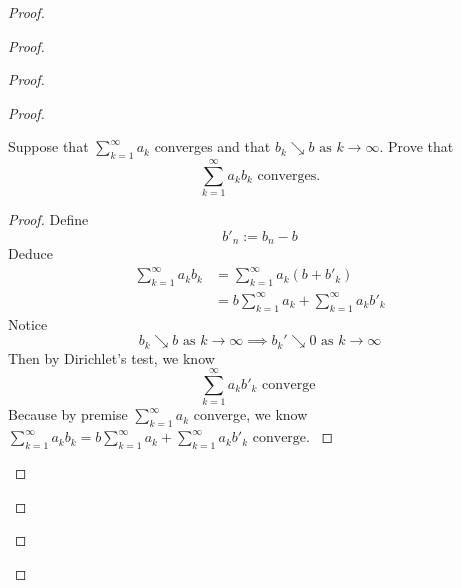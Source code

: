 \documentclass{report}
\begin{document}
\begin{proof}
\begin{proof}
\begin{proof}
\begin{proof}
\begin{question}{}{}
Suppose that $\sum_{k=1}^{\infty} a_k$ 
converges and that 
$b_k \searrow b \text{ as } k \to \infty$. Prove that 
\begin{equation*}
  \sum_{k=1}^{\infty} a_k b_k \text{ converges.}
\end{equation*}
\end{question}
\begin{proof}
Define
\begin{equation*}
b'_n:=b_n-b
\end{equation*}
Deduce
\begin{align*}
  \sum_{k=1}^\infty a_kb_k&=\sum_{k=1}^\infty a_k(b+b'_k)\\
  &=b\sum_{k=1}^\infty a_k+\sum_{k=1}^\infty a_kb'_k
\end{align*}
Notice
\begin{equation*}
b_k\searrow b\text{ as }k\to\infty\implies b_k'\searrow 0\text{ as }k\to\infty
\end{equation*}
Then by Dirichlet's test, we know
\begin{equation*}
\sum_{k=1}^\infty a_kb'_k\text{ converge }
\end{equation*}
Because by premise $\sum_{k=1}^\infty a_k$ converge, we know $\sum_{k=1}^\infty a_kb_k=b\sum_{k=1}^\infty a_k+\sum_{k=1}^\infty a_kb'_k\text{ converge. }$


\end{proof}


\end{proof}
\end{proof}
\end{proof}
\end{proof}
\end{document}
